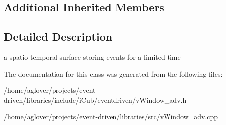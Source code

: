 \subsection*{Additional Inherited Members}


\subsection{Detailed Description}
a spatio-\/temporal surface storing events for a limited time 

The documentation for this class was generated from the following files\+:\begin{DoxyCompactItemize}
\item 
/home/aglover/projects/event-\/driven/libraries/include/i\+Cub/eventdriven/v\+Window\+\_\+adv.\+h\item 
/home/aglover/projects/event-\/driven/libraries/src/v\+Window\+\_\+adv.\+cpp\end{DoxyCompactItemize}
